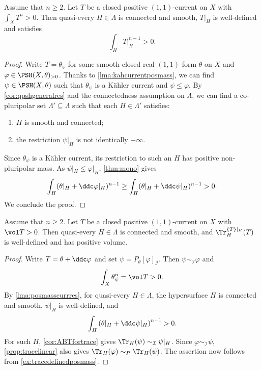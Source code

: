 \begin{lemma}\label{lma:posmasscurrres}
    Assume that $n\geq 2$.
    Let $T$ be a closed positive $(1,1)$-current on $X$ with $\int_X T^n>0$. Then quasi-every $H\in \Lambda$ is connected and smooth, $T|_H$ is well-defined and satisfies
    \[
    \int_H T|_H^{n-1}>0.
    \]
\end{lemma}
\begin{proof}
    Write $T=\theta_{\varphi}$ for some smooth closed real $(1,1)$-form $\theta$ on $X$ and $\varphi\in \PSH(X,\theta)_{>0}$. Thanks to \cref{lma:kahcurrentposmass}, we can find $\psi\in \PSH(X,\theta)$ such that $\theta_{\psi}$ is a K\"ahler current and $\psi\leq \varphi$. By \cref{cor:qpshgeneralres} and the connectedness assumption on $\Lambda$, we can find a co-pluripolar set $\Lambda'\subseteq \Lambda$ such that each $H\in \Lambda'$ satisfies:
    \begin{enumerate}
        \item\label{itm:chapter-trace:L977:1} $H$ is smooth and connected;
        \item\label{itm:chapter-trace:L977:2} the restriction $\psi|_H$ is not identically $-\infty$.
    \end{enumerate}
    Since $\theta_\psi$ is a Kähler current, its restriction to such an $H$ has positive non-pluripolar mass. As $\psi|_H\leq\varphi|_H$, \cref{thm:mono} gives
    \[
        \int_H(\theta|_H+\ddc\varphi|_H)^{n-1} \geq \int_H(\theta|_H+\ddc\psi|_H)^{n-1}>0.
    \]
    We conclude the proof.
\end{proof}

\begin{corollary}\label{cor:tracegeneralwelldef}
    Assume that $n\geq 2$. Let $T$ be a closed positive $(1,1)$-current on $X$ with $\vol T>0$. Then quasi-every $H\in \Lambda$ is connected and smooth, and $\Tr_H^{\{T\}|_H}(T)$ is well-defined and has positive volume.
\end{corollary}
\begin{proof}
    Write $T=\theta+\ddc\varphi$ and set $\psi=P_{\theta}[\varphi]_{\mathcal{I}}$. Then $\psi\sim_{\mathcal{I}}\varphi$ and
    \[
        \int_X \theta_{\psi}^{n}=\vol T>0.
    \]
    By \cref{lma:posmasscurrres}, for quasi-every $H\in \Lambda$, the hypersurface $H$ is connected and smooth, $\psi|_H$ is well-defined, and
    \[
        \int_H \left(\theta|_H+\ddc\psi|_H\right)^{n-1}>0.
    \]
    For such $H$, \cref{cor:ABTfortrace} gives $\Tr_H(\psi)\sim_{\mathcal{I}}\psi|_H$. Since $\varphi\sim_{\mathcal{I}}\psi$, \cref{prop:tracelinear} also gives $\Tr_H(\varphi)\sim_P\Tr_H(\psi)$. The assertion now follows from \cref{ex:tracedefinedposmass}.
\end{proof}

